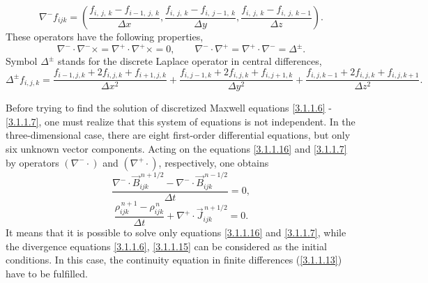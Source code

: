 \begin{equation}
\label{3.1.1.9}
\nabla^{-} f_{i j k} = \left(\frac{f_{i,\: j,\: k} - f_{i - 1,\: j,\: k}}{\Delta x}, \frac{f_{i,\: j,\: k} - f_{i,\: j - 1,\: k}}{\Delta y}, \frac{f_{i,\: j,\: k} - f_{i,\: j,\: k - 1}}{\Delta z} \right).
\end{equation}
These operators have the following properties,
\begin{equation}
\label{3.1.1.10}
\nabla^{-} \cdot \nabla^{-} \times = \nabla^{+} \cdot \nabla^{+} \times = 0, \qquad \nabla^{-} \cdot \nabla^{+} = \nabla^{+} \cdot \nabla^{-} = \Delta^{\pm}.
\end{equation}
Symbol $ \Delta^{\pm} $ stands for the discrete Laplace operator in central differences,
\begin{equation}
\label{3.1.1.11}
\Delta^{\pm} f_{i, j, k} = \frac{f_{i - 1, j, k} + 2 f_{i, j, k} + f_{i + 1, j, k}}{\Delta x^{2}} + \frac{f_{i, j - 1, k} + 2 f_{i, j, k} + f_{i, j + 1, k}}{\Delta y^{2}} + \frac{f_{i, j, k - 1} + 2 f_{i, j, k} + f_{i, j, k + 1}}{\Delta z^{2}}.
\end{equation}

Before trying to find the solution of discretized Maxwell equations \ref{3.1.1.6} - \ref{3.1.1.7}, one must realize that this system of equations is not independent. In the three-dimensional case, there are eight first-order differential equations, but only six unknown vector components. Acting on the equations \ref{3.1.1.16} and \ref{3.1.1.7} by operators $ \left(\nabla^{-}\cdot\right) $ and $ \left(\nabla^{+}\cdot\right) $, respectively, one obtains
\begin{equation}
\label{3.1.1.12}
\frac{\nabla^{-} \cdot \vec{B}_{ijk}^{\,n + 1/2} - \nabla^{-} \cdot \vec{B}_{ijk}^{\,n - 1/2}}{\Delta t} = 0,
\end{equation}
\begin{equation}
\label{3.1.1.13}
\frac{\rho_{ijk}^{\,n + 1} - \rho_{ijk}^{\,n}}{\Delta t} + \nabla^{+} \cdot \vec{J}_{ijk}^{\,n + 1/2} = 0.
\end{equation}
It means that it is possible to solve only equations \ref{3.1.1.16} and \ref{3.1.1.7}, while the divergence equations \ref{3.1.1.6}, \ref{3.1.1.15} can be considered as the initial conditions. In this case, the continuity equation in finite differences (\ref{3.1.1.13}) have to be fulfilled.
